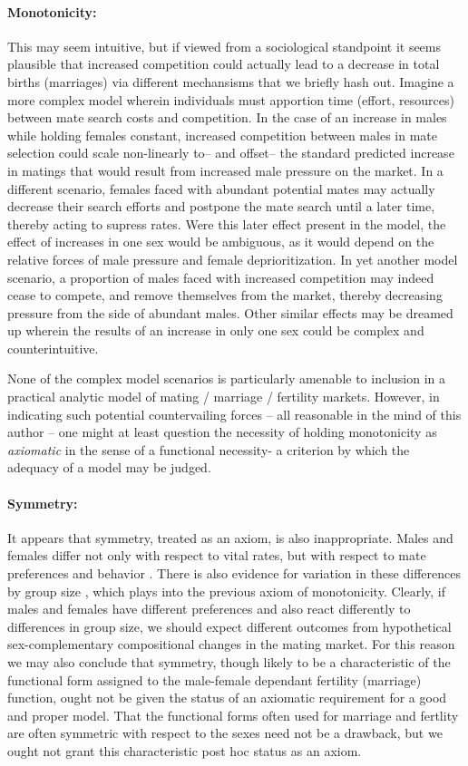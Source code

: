 \paragraph{Monotonicity:} This may seem intuitive, but if viewed from a
sociological standpoint it seems plausible that increased competition could actually lead to a
decrease in total births (marriages) via different mechansisms that we
briefly hash out. Imagine a more complex model wherein individuals must
apportion time (effort, resources) between mate search costs and competition. 
In the case of an increase in males while holding females
constant, increased competition between males in mate selection could
 scale non-linearly to-- and offset-- the standard predicted increase in matings
 that would result from increased male pressure on the market. In a different
 scenario, females faced with abundant potential mates may actually decrease their 
 search efforts and postpone the mate search until a later time,
 thereby acting to supress rates. Were this later effect present in the model,
 the effect of increases in one sex would be ambiguous, as it would depend on
 the relative forces of male pressure and female deprioritization. In yet
 another model scenario, a proportion of males faced with increased competition may 
 indeed cease to compete, and remove themselves from the market, thereby 
 decreasing pressure from the side of abundant males. Other similar effects may
 be dreamed up wherein the results of an increase in only one sex could be
 complex and counterintuitive. 
 
 None of the complex model scenarios is particularly amenable to inclusion in
 a practical analytic model of mating / marriage / fertility markets. However,
 in indicating such potential countervailing forces -- all reasonable in the
 mind of this author -- one might at least question the necessity of holding
 monotonicity as \textit{axiomatic} in the sense of a functional necessity- a
 criterion by which the adequacy of a model may be judged. 

\paragraph{Symmetry:} It appears that symmetry, treated as an axiom, is also
inappropriate. Males and females differ not only with respect to vital rates,
but with respect to mate preferences and behavior \citep{buss1989sex}. There is
also evidence for variation in these differences by group size
\citep{fisman2006gender}, which plays into the previous axiom of monotonicity.
Clearly, if males and females have different preferences and also react
differently to differences in group size, we should expect different outcomes
from hypothetical sex-complementary compositional changes in the mating market.
For this reason we may also conclude that symmetry, though likely to be a
characteristic of the functional form assigned to the male-female
dependant fertility (marriage) function, ought not be given the status of an
axiomatic requirement for a good and proper model. That the functional forms
often used for marriage and fertlity are often symmetric with respect to the
sexes need not be a drawback, but we ought not grant this characteristic post
hoc status as an axiom.

